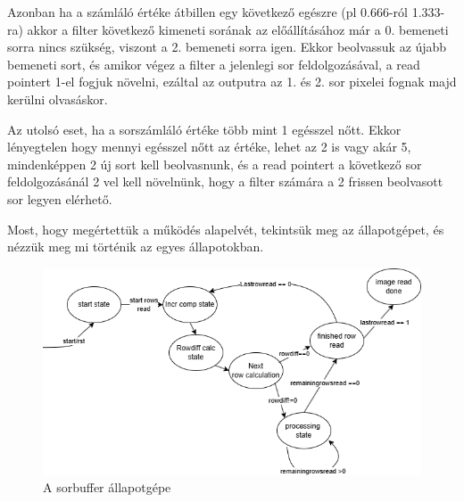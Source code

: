 Azonban ha a számláló értéke átbillen egy következő egészre (pl 0.666-ról 1.333-ra) akkor a filter következő kimeneti sorának az előállításához már a 0. bemeneti sorra nincs szükség, viszont a 2. bemeneti sorra igen. Ekkor beolvassuk az újabb bemeneti sort, és amikor végez a filter a jelenlegi sor feldolgozásával, a read pointert 1-el fogjuk növelni, ezáltal az outputra az 1. és 2. sor pixelei fognak majd kerülni olvasáskor.

Az utolsó eset, ha a sorszámláló értéke több mint 1 egésszel nőtt. Ekkor lényegtelen hogy mennyi egésszel nőtt az értéke, lehet az 2 is vagy akár 5, mindenképpen 2 új sort kell beolvasnunk, és a read pointert a következő sor feldolgozásánál 2 vel kell növelnünk, hogy a filter számára a 2 frissen beolvasott sor legyen elérhető.

Most, hogy megértettük a működés alapelvét, tekintsük meg az állapotgépet, és nézzük meg mi történik az egyes állapotokban.

\begin{figure}[!ht]
	\centering
	\includegraphics[width=120mm, keepaspectratio]{figures/sorbuffer_allapotgep.png}
	\caption{A sorbuffer állapotgépe} 
	\label{pic:sorbuffer_allapotgep}
\end{figure}

